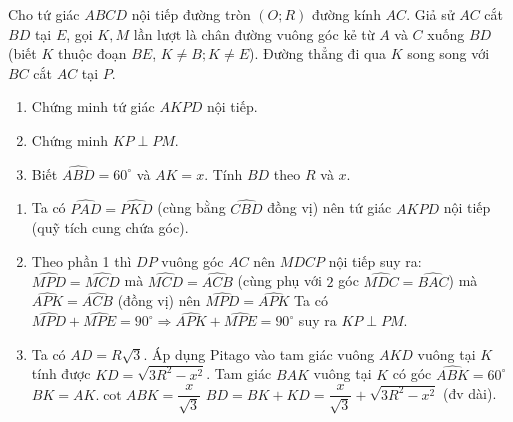 \begin{ex}%
	Cho tứ giác $ABCD$ nội tiếp  đường tròn $(O;R)$ đường kính $AC$. Giả sử $AC$ cắt $BD$ tại $E$, gọi $K,M$ lần lượt là chân đường vuông góc kẻ từ $A$ và $C$ xuống $BD$ (biết $K$ thuộc đoạn $BE$, $K\neq B; K\neq E$). Đường thẳng đi qua $K$ song song với $BC$ cắt $AC$ tại $P$.
	\begin{enumerate}
		\item Chứng minh tứ giác $AKPD$ nội tiếp.
		\item Chứng minh $KP\perp PM$.
		\item Biết $\widehat{ABD}={{60}^\circ}$ và $AK=x$. Tính $BD$ theo $R$ và $x$.
	\end{enumerate}
	\loigiai
	{
		\begin{center}
		\end{center}
		\begin{enumerate}
			\item Ta có $\widehat{PAD}=\widehat{PKD}$ 
			(cùng bằng $\widehat{CBD}$  đồng vị) nên tứ giác $AKPD$ nội tiếp (quỹ tích cung chứa góc).
			\item Theo  phần 1  thì $DP$ vuông góc $AC$ nên $MDCP$ nội tiếp suy ra: $\widehat{MPD}=\widehat{MCD}$ mà  $\widehat{MCD}=\widehat{ACB}$ (cùng phụ với $2$ góc $\widehat{MDC}=\widehat{BAC}$) mà $\widehat{APK}=\widehat{ACB}$ (đồng vị) nên $\widehat{MPD}=\widehat{APK}$  Ta có $\widehat{MPD}+\widehat{MPE}=90^\circ\Rightarrow \widehat{APK}+\widehat{MPE}=90^\circ $ suy ra  $KP\perp PM$.
	\item Ta có $AD=R\sqrt{3}$. Áp dụng Pitago vào tam giác vuông  $AKD$ vuông tại $K$ tính được $KD=\sqrt{3{{R}^{2}}-{{x}^{2}}}$. Tam giác $BAK$ vuông tại $K$  có góc $\widehat{ABK}=60^\circ$  $BK=AK.\cot ABK=\dfrac{x}{\sqrt{3}}$  
	$BD=BK+KD=\dfrac{x}{\sqrt{3}}+\sqrt{3{{R}^{2}}-{{x}^{2}}}$ (đv dài).
	\end{enumerate}
}
\end{ex}
